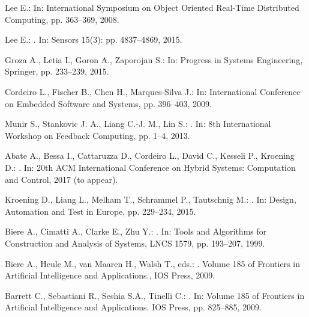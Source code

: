 \documentclass{acm_sen_article}
\begin{document}
{\begin{thebibliography}{1}
Lee E.:
\newblock In: International Symposium on Object Oriented Real-Time Distributed Computing, pp. 363--369, 2008.

Lee E.:
. 
\newblock In: Sensors 15(3): pp. 4837--4869, 2015.

Groza A., Letia I., Goron A., Zaporojan S.: 
\newblock In: Progress in Systems Engineering, Springer, pp. 233--239, 2015.

Cordeiro L., Fischer B., Chen H., Marques-Silva J.:
\newblock In: International Conference on Embedded Software and Systems, pp. 396--403, 2009.

Munir S., Stankovic J. A., Liang C.-J. M., Lin S.:
. 
\newblock In: 8th International Workshop on Feedback Computing, pp. 1--4, 2013.

Abate A., Bessa I., Cattaruzza D., Cordeiro L., David C., Kesseli P., Kroening D.:
.
\newblock In: 20th ACM International Conference on Hybrid Systems: Computation and Control, 2017 (to appear).

Kroening D., Liang L., Melham T., Schrammel P., Tautschnig M.:
. 
\newblock In: Design, Automation and Test in Europe, pp. 229--234, 2015.

Biere A., Cimatti A., Clarke E., Zhu Y.:
. 
\newblock In: Tools and Algorithms for Construction and Analysis of Systems, LNCS 1579, pp. 193--207, 1999.

Biere A., Heule M., van Maaren H., Walsh T., eds.:
.
\newblock Volume 185 of Frontiers in Artificial Intelligence and Applications., {IOS} Press, 2009.

Barrett C., Sebastiani R., Seshia S.A., Tinelli C.:
. 
\newblock In: Volume 185 of Frontiers in Artificial Intelligence and Applications. IOS Press, pp. 825--885, 2009.


\end{thebibliography}}
\end{document}
